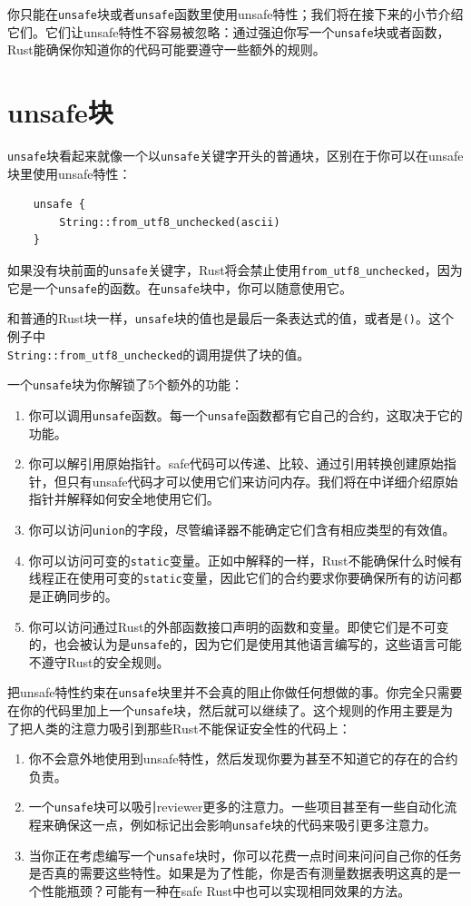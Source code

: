 你只能在\texttt{unsafe}块或者\texttt{unsafe}函数里使用unsafe特性；我们将在接下来的小节介绍它们。它们让unsafe特性不容易被忽略：通过强迫你写一个\texttt{unsafe}块或者函数，Rust能确保你知道你的代码可能要遵守一些额外的规则。

\section{unsafe块}
\texttt{unsafe}块看起来就像一个以\texttt{unsafe}关键字开头的普通块，区别在于你可以在unsafe块里使用unsafe特性：
\begin{verbatim}
    unsafe {
        String::from_utf8_unchecked(ascii)
    }
\end{verbatim}

如果没有块前面的\texttt{unsafe}关键字，Rust将会禁止使用\texttt{from\_utf8\_unchecked}，因为它是一个\texttt{unsafe}的函数。在\texttt{unsafe}块中，你可以随意使用它。

和普通的Rust块一样，\texttt{unsafe}块的值也是最后一条表达式的值，或者是\texttt{()}。这个例子中\\
\texttt{String::from\_utf8\_unchecked}的调用提供了块的值。

一个\texttt{unsafe}块为你解锁了5个额外的功能：
\begin{enumerate}
    \item 你可以调用\texttt{unsafe}函数。每一个\texttt{unsafe}函数都有它自己的合约，这取决于它的功能。
    \item 你可以解引用原始指针。safe代码可以传递、比较、通过引用转换创建原始指针，但只有unsafe代码才可以使用它们来访问内存。我们将在中详细介绍原始指针并解释如何安全地使用它们。
    \item 你可以访问\texttt{union}的字段，尽管编译器不能确定它们含有相应类型的有效值。
    \item 你可以访问可变的\texttt{static}变量。正如中解释的一样，Rust不能确保什么时候有线程正在使用可变的\texttt{static}变量，因此它们的合约要求你要确保所有的访问都是正确同步的。
    \item 你可以访问通过Rust的外部函数接口声明的函数和变量。即使它们是不可变的，也会被认为是\texttt{unsafe}的，因为它们是使用其他语言编写的，这些语言可能不遵守Rust的安全规则。
\end{enumerate}

把unsafe特性约束在\texttt{unsafe}块里并不会真的阻止你做任何想做的事。你完全只需要在你的代码里加上一个\texttt{unsafe}块，然后就可以继续了。这个规则的作用主要是为了把人类的注意力吸引到那些Rust不能保证安全性的代码上：
\begin{enumerate}
    \item 你不会意外地使用到unsafe特性，然后发现你要为甚至不知道它的存在的合约负责。
    \item 一个\texttt{unsafe}块可以吸引reviewer更多的注意力。一些项目甚至有一些自动化流程来确保这一点，例如标记出会影响\texttt{unsafe}块的代码来吸引更多注意力。
    \item 当你正在考虑编写一个\texttt{unsafe}块时，你可以花费一点时间来问问自己你的任务是否真的需要这些特性。如果是为了性能，你是否有测量数据表明这真的是一个性能瓶颈？可能有一种在safe Rust中也可以实现相同效果的方法。
\end{enumerate}


